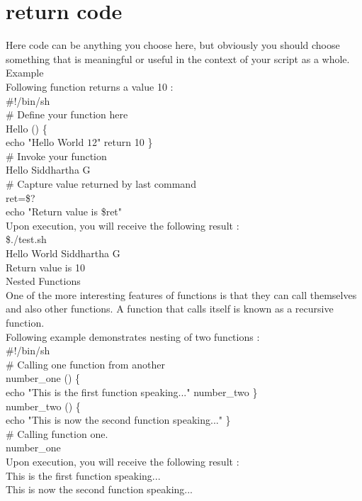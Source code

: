 \documentclass{article}
\begin{document}
\section*{return code}
Here code can be anything you choose here, but obviously you should choose something that is meaningful or useful in the context of your script as a whole.\\
Example\\
Following function returns a value 10 :\\
\#!/bin/sh\\
\# Define your function here\\
Hello () \{\\
   echo "Hello World $1 $2"
   return 10
\}\\
\# Invoke your function\\
Hello Siddhartha G\\
\# Capture value returned by last command\\
ret=\$?\\
echo "Return value is \$ret"\\
Upon execution, you will receive the following result :\\
\$./test.sh\\
Hello World Siddhartha G\\
Return value is 10\\
Nested Functions\\
One of the more interesting features of functions is that they can call themselves and also other functions. A function that calls itself is known as a recursive function.\\
Following example demonstrates nesting of two functions :\\
\#!/bin/sh\\
\# Calling one function from another\\
number\_one () \{\\
   echo "This is the first function speaking..."
   number\_two
\}\\
number\_two () \{\\
   echo "This is now the second function speaking..."
\}\\
\# Calling function one.\\
number\_one\\
Upon execution, you will receive the following result :\\
This is the first function speaking...\\
This is now the second function speaking...\\
\end{document}
